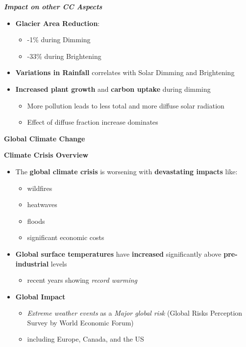 \documentclass[fontsize=8pt, a4paper, landscape, fleqn]{scrartcl}
\renewcommand{\section}[1]{%
    \noindent\colorbox{sectioncolor}{%
        \parbox{\dimexpr\columnwidth-2\fboxsep}{\color{white}\textbf{#1}}}%
    \vspace{0.5mm}%
}
\renewcommand{\subsection}[1]{%
    \noindent\colorbox{subsectioncolor}{%
        \parbox{\dimexpr\columnwidth-2\fboxsep}{\color{white}\textbf{#1}}}%
    \vspace{0.5mm}%
}
\renewcommand{\subsubsection}[1]{%
    \noindent\textbf{\textit{\color{subsectioncolor}#1}}%
    \vspace{1mm}%
}
\begin{document}
\begin{multicols*}{3}[\raggedcolumns]
\subsubsection{Impact on other CC Aspects}
\begin{itemize}
    \item \textbf{Glacier Area Reduction}:
        \begin{itemize}
            \item -1\% during Dimming
            \item -33\% during Brightening
        \end{itemize}
    \item \textbf{Variations in Rainfall} correlates with Solar Dimming and Brightening
    \item \textbf{Increased plant growth} and \textbf{carbon uptake} during dimming
        \begin{itemize}
            \item More pollution leads to less total and more diffuse solar radiation
            \item Effect of diffuse fraction increase dominates
        \end{itemize}
\end{itemize}

\section{Global Climate Change}
\subsection{Climate Crisis Overview}
\begin{itemize}
    \item The \textbf{global climate crisis} is worsening with \textbf{devastating impacts} like:
        \begin{itemize}
            \item wildfires
            \item heatwaves
            \item floods
            \item significant economic costs
        \end{itemize}
    \item \textbf{Global surface temperatures} have \textbf{increased} significantly above \textbf{pre-industrial} levels
        \begin{itemize}
            \item recent years showing \textit{record warming}
        \end{itemize}
    \item \textbf{Global Impact}
        \begin{itemize}
            \item \textit{Extreme weather events} as a \textit{Major global risk} (Global Risks Perception Survey by World Economic Forum)
            \item including Europe, Canada, and the US
        \end{itemize}
\end{itemize}


\end{multicols*}
\end{document}
